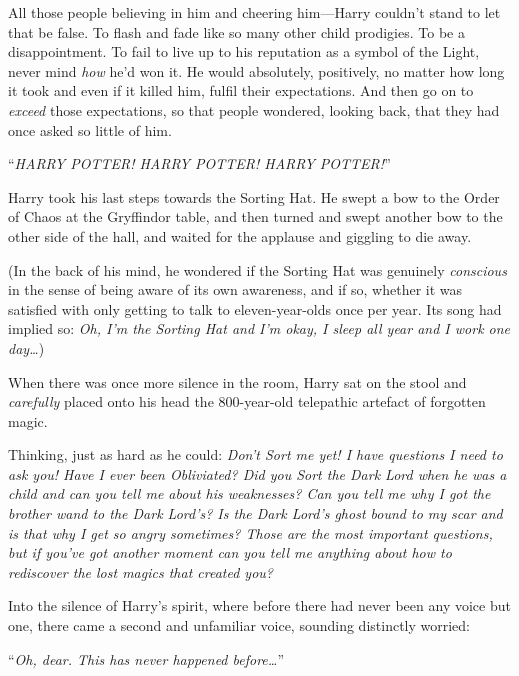 All those people believing in him and cheering him—Harry couldn’t stand to
let that be false. To flash and fade like so many other child prodigies. To be
a disappointment. To fail to live up to his reputation as a symbol of the
Light, never mind \emph{how} he’d won it. He would absolutely, positively,
no matter how long it took and even if it killed him, fulfil their
expectations. And then go on to \emph{exceed} those expectations, so that
people wondered, looking back, that they had once asked so little of him.

“\emph{HARRY POTTER! HARRY POTTER! HARRY POTTER!}”

Harry took his last steps towards the Sorting Hat. He swept a bow to the Order
of Chaos at the Gryffindor table, and then turned and swept another bow to the
other side of the hall, and waited for the applause and giggling to die away.

(In the back of his mind, he wondered if the Sorting Hat was genuinely
\emph{conscious} in the sense of being aware of its own awareness, and if so,
whether it was satisfied with only getting to talk to eleven-year-olds once per
year. Its song had implied so: \emph{Oh, I’m the Sorting Hat and I’m okay, I
sleep all year and I work one day…})

When there was once more silence in the room, Harry sat on the stool and
\emph{carefully} placed onto his head the 800-year-old telepathic artefact of
forgotten magic.

Thinking, just as hard as he could: \emph{Don’t Sort me yet! I have questions I
need to ask you! Have I ever been Obliviated? Did you Sort the Dark Lord when
he was a child and can you tell me about his weaknesses? Can you tell me why I
got the brother wand to the Dark Lord’s? Is the Dark Lord’s ghost bound to my
scar and is that why I get so angry sometimes? Those are the most important
questions, but if you’ve got another moment can you tell me anything about how
to rediscover the lost magics that created you?}

Into the silence of Harry’s spirit, where before there had never been any voice
but one, there came a second and unfamiliar voice, sounding distinctly worried:

“\emph{Oh, dear. This has never happened before…}”
